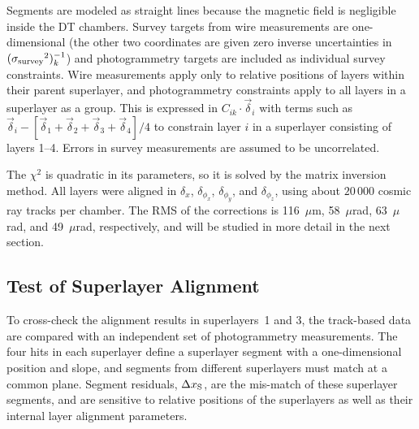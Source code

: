 Segments are modeled as straight lines because the magnetic
field is negligible inside the DT chambers.  Survey targets from wire
measurements are one-dimensional (the other two coordinates are given
zero inverse uncertainties in $({\sigma_{\mbox{\scriptsize
survey}}}^2)_k^{-1}$) and photogrammetry targets are included as
individual survey constraints.  Wire measurements apply only to
relative positions of layers within their parent superlayer, and
photogrammetry constraints apply to all layers in a superlayer as a
group.  This is expressed in $C_{ik} \cdot \vec{\delta}_i$ with terms
such as $\vec{\delta}_i - [\vec{\delta}_1 + \vec{\delta}_2
+ \vec{\delta}_3 + \vec{\delta}_4]/4$ to constrain layer $i$ in a
superlayer consisting of layers 1--4.  Errors in survey measurements
are assumed to be uncorrelated.

The $\chi^2$ is quadratic in its parameters, so it is solved by the matrix
inversion method.  All layers were aligned in $\delta_x$, $\delta_{\phi_x}$,
$\delta_{\phi_y}$, and $\delta_{\phi_z}$, using about $20\,000$ cosmic
ray tracks per chamber.  The RMS of the corrections is 116~$\mu$m,
58~$\mu$rad, 63~$\mu$rad, and 49~$\mu$rad, respectively, and will be
studied in more detail in the next section.

\subsection{Test of Superlayer Alignment}
\label{sec:superlayertest}

To cross-check the alignment results in superlayers~1 and 3, the
track-based data are compared with an independent set of photogrammetry
measurements.  The four hits in each superlayer define a superlayer
segment with a one-dimensional position and slope, and segments from
different superlayers must match at a common plane.  Segment residuals,
$\Delta x_{\mbox{\scriptsize S}}$, are the mis-match of these superlayer
segments, and are sensitive to relative positions of the superlayers as well as their
internal layer alignment parameters.

